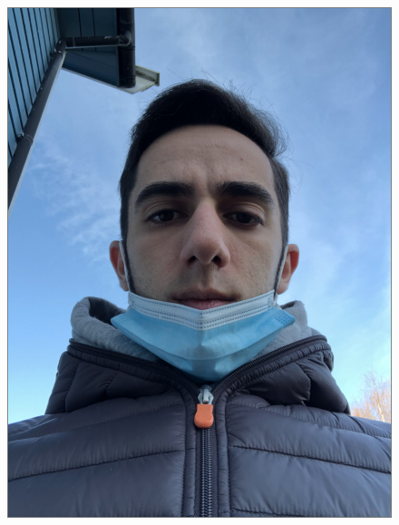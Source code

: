 \begin{figure}[h]
        {\includegraphics[scale = 0.18]{figures/1110.png}\hspace{1cm}}

\end{figure}
